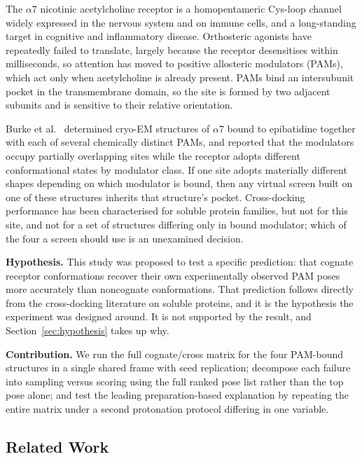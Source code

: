 \documentclass[sigconf]{acmart}
\begin{document}
The $\alpha$7 nicotinic acetylcholine receptor is a homopentameric Cys-loop
channel widely expressed in the nervous system and on immune cells, and a
long-standing target in cognitive and inflammatory disease. Orthosteric agonists
have repeatedly failed to translate, largely because the receptor desensitises
within milliseconds, so attention has moved to positive allosteric modulators
(PAMs), which act only when acetylcholine is already present. PAMs bind an
intersubunit pocket in the transmembrane domain, so the site is formed by two
adjacent subunits and is sensitive to their relative orientation.

Burke et al.~\cite{burke2024} determined cryo-EM structures of $\alpha$7 bound to
epibatidine together with each of several chemically distinct PAMs, and reported
that the modulators occupy partially overlapping sites while the receptor adopts
different conformational states by modulator class. If one site adopts materially
different shapes depending on which modulator is bound, then any virtual screen
built on one of these structures inherits that structure's pocket. Cross-docking
performance has been characterised for soluble protein families, but not for this
site, and not for a set of structures differing only in bound modulator; which of
the four a screen should use is an unexamined decision.

\textbf{Hypothesis.} This study was proposed to test a specific prediction: that
cognate receptor conformations recover their own experimentally observed PAM poses
more accurately than noncognate conformations. That prediction follows directly
from the cross-docking literature on soluble proteins, and it is the hypothesis the
experiment was designed around. It is not supported by the result, and
Section~\ref{sec:hypothesis} takes up why.

\textbf{Contribution.} We run the full cognate/cross matrix for the four PAM-bound
structures in a single shared frame with seed replication; decompose each failure
into sampling versus scoring using the full ranked pose list rather than the top
pose alone; and test the leading preparation-based explanation by repeating the
entire matrix under a second protonation protocol differing in one variable.

\subsection{Related Work}
\end{document}
